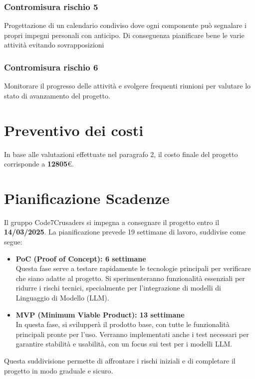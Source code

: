 \documentclass{article}
\begin{document}
\subsubsection{Contromisura rischio 5}
Progettazione di un calendario condiviso dove ogni componente può segnalare i propri impegni personali con anticipo. Di conseguenza pianificare bene le varie attività evitando sovrapposizioni
\subsubsection{Contromisura rischio 6}
Monitorare il progresso delle attività e svolgere frequenti riunioni per valutare lo stato di avanzamento del progetto. 

\newpage
\section{Preventivo dei costi}
In base alle valutazioni effettuate nel paragrafo 2, il costo finale del progetto corrisponde a \textbf{12805}\euro .

\section{Pianificazione Scadenze}
Il gruppo Code7Crusaders si impegna a consegnare il progetto entro il \textbf{14/03/2025}. La pianificazione prevede 19 settimane di lavoro, suddivise come segue:

\begin{itemize}
    \item \textbf{PoC (Proof of Concept): 6 settimane} \\
    Questa fase serve a testare rapidamente le tecnologie principali per verificare che siano adatte al progetto. Si sperimenteranno funzionalità essenziali per ridurre i rischi tecnici, specialmente per l'integrazione di modelli di Linguaggio di Modello (LLM).

    \item \textbf{MVP (Minimum Viable Product): 13 settimane} \\
    In questa fase, si svilupperà il prodotto base, con tutte le funzionalità principali pronte per l’uso. Verranno implementati anche i test necessari per garantire stabilità e usabilità, con un focus sui test per i modelli LLM.
\end{itemize}

Questa suddivisione permette di affrontare i rischi iniziali e di completare il progetto in modo graduale e sicuro.
\end{document}
